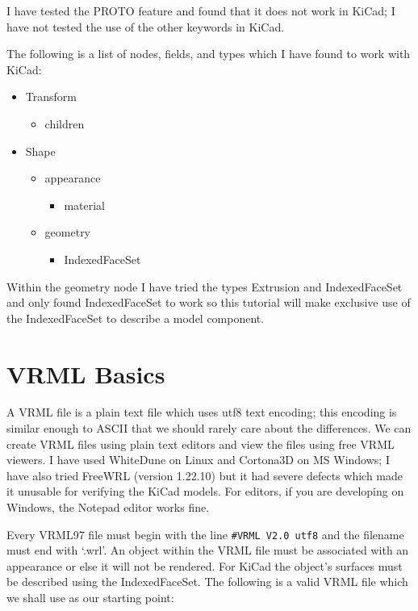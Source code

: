 \documentclass[a4paper]{article}
\begin{document}
I have tested the PROTO feature and found that it does not work in KiCad; I have not tested the use of the other keywords in KiCad.

The following is a list of nodes, fields, and types which I have found to work with KiCad:

\begin{itemize}
\item Transform
  \begin{itemize}
    \item children
  \end{itemize}
\item Shape
  \begin{itemize}
    \item appearance
      \begin{itemize}
        \item material
      \end{itemize}
    \item geometry
      \begin{itemize}
        \item IndexedFaceSet
      \end{itemize}
  \end{itemize}
\end{itemize}

Within the geometry node I have tried the types Extrusion and IndexedFaceSet and only found IndexedFaceSet to work so this tutorial will
make exclusive use of the IndexedFaceSet to describe a model component.

\section{VRML Basics}
 A VRML file is a plain text file which uses utf8 text encoding; this encoding is similar enough to ASCII that we should rarely care about the differences.
We can create VRML files using plain text editors and view the files using free VRML viewers. I have used WhiteDune on Linux and Cortona3D on
MS Windows; I have also tried FreeWRL (version 1.22.10) but it had severe defects which made it unusable for verifying the KiCad models.
For editors, if you are developing on Windows, the Notepad editor works fine.

Every VRML97 file must begin with the line \verb~#VRML V2.0 utf8~ and the filename must end with `.wrl'. An object within the VRML file must
be associated with an appearance or else it will not be rendered. For KiCad the object's surfaces must be described using the IndexedFaceSet.
The following is a valid VRML file which we shall use as our starting point:
\end{document}
